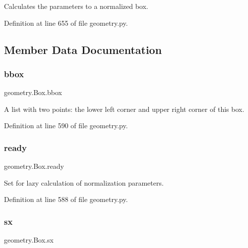 \begin{DoxyVerb}Calculates the parameters to a normalized box.\end{DoxyVerb}
 

Definition at line 655 of file geometry.\+py.



\subsection{Member Data Documentation}
\mbox{\label{classgeometry_1_1Box_a6bf768dc4c7628cc2fe863eb3a002475}} 
\subsubsection{\texorpdfstring{bbox}{bbox}}
{\footnotesize\ttfamily geometry.\+Box.\+bbox}



A list with two points\+: the lower left corner and upper right corner of this box. 



Definition at line 590 of file geometry.\+py.

\mbox{\label{classgeometry_1_1Box_aaa2928bad8272b83deb2cbe543b68c66}} 
\subsubsection{\texorpdfstring{ready}{ready}}
{\footnotesize\ttfamily geometry.\+Box.\+ready}



Set for lazy calculation of normalization parameters. 



Definition at line 588 of file geometry.\+py.

\mbox{\label{classgeometry_1_1Box_a43781b0f4c451cbb542c20b5fbd4b5dd}} 
\subsubsection{\texorpdfstring{sx}{sx}}
{\footnotesize\ttfamily geometry.\+Box.\+sx}



